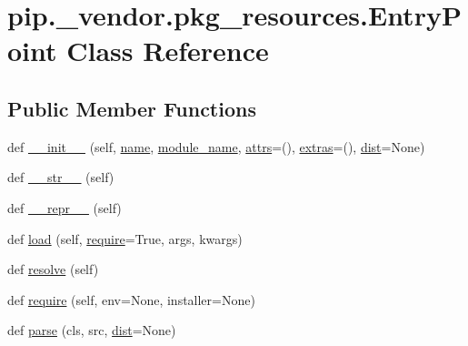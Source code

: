 \hypertarget{classpip_1_1__vendor_1_1pkg__resources_1_1EntryPoint}{}\section{pip.\+\_\+vendor.\+pkg\+\_\+resources.\+Entry\+Point Class Reference}
\label{classpip_1_1__vendor_1_1pkg__resources_1_1EntryPoint}
\subsection*{Public Member Functions}
\begin{DoxyCompactItemize}
\item 
def \hyperlink{classpip_1_1__vendor_1_1pkg__resources_1_1EntryPoint_a0f37c757d9065b57073509fd81a824e9}{\+\_\+\+\_\+init\+\_\+\+\_\+} (self, \hyperlink{classpip_1_1__vendor_1_1pkg__resources_1_1EntryPoint_a635d07dcee44f4fb1744e670dda216a4}{name}, \hyperlink{classpip_1_1__vendor_1_1pkg__resources_1_1EntryPoint_aa1b5517c4e2866708e4af59575878e4e}{module\+\_\+name}, \hyperlink{classpip_1_1__vendor_1_1pkg__resources_1_1EntryPoint_af9121f2b44ec692cb70a89047b125e74}{attrs}=(), \hyperlink{classpip_1_1__vendor_1_1pkg__resources_1_1EntryPoint_a7d6f7deb16e02871f135b59b146ef522}{extras}=(), \hyperlink{classpip_1_1__vendor_1_1pkg__resources_1_1EntryPoint_a49299c8f3500aa7c597471c965178590}{dist}=None)
\item 
def \hyperlink{classpip_1_1__vendor_1_1pkg__resources_1_1EntryPoint_a5a54c7b13ce715a9a1f39ff745484041}{\+\_\+\+\_\+str\+\_\+\+\_\+} (self)
\item 
def \hyperlink{classpip_1_1__vendor_1_1pkg__resources_1_1EntryPoint_a83bcee26ba11bd88ba2bea2a5c7d5dfd}{\+\_\+\+\_\+repr\+\_\+\+\_\+} (self)
\item 
def \hyperlink{classpip_1_1__vendor_1_1pkg__resources_1_1EntryPoint_a50797fcb50ff289c64454d1415d14e83}{load} (self, \hyperlink{classpip_1_1__vendor_1_1pkg__resources_1_1EntryPoint_af0ed84af1bbc41216a78c9108171a678}{require}=True, args, kwargs)
\item 
def \hyperlink{classpip_1_1__vendor_1_1pkg__resources_1_1EntryPoint_a2d3a69e49b7173249cc45c746af895d9}{resolve} (self)
\item 
def \hyperlink{classpip_1_1__vendor_1_1pkg__resources_1_1EntryPoint_af0ed84af1bbc41216a78c9108171a678}{require} (self, env=None, installer=None)
\item 
def \hyperlink{classpip_1_1__vendor_1_1pkg__resources_1_1EntryPoint_a4531e99bede9d6301429f729211ff862}{parse} (cls, src, \hyperlink{classpip_1_1__vendor_1_1pkg__resources_1_1EntryPoint_a49299c8f3500aa7c597471c965178590}{dist}=None)

\end{DoxyCompactItemize}
